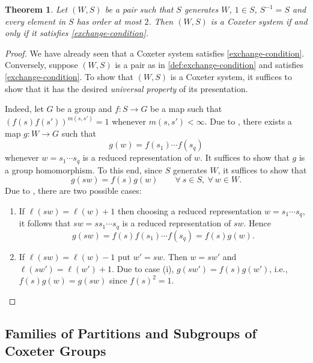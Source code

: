\documentclass{article}
\theoremstyle{thmstyle}
\newtheorem{theorem}{Theorem}[section]
\theoremstyle{defstyle}
\begin{document}
\begin{theorem}
    Let $(W, S)$ be a pair such that $S$ generates $W$, $1\in S$, $S^{-1} = S$ and every element in $S$ has order at most $2$. Then $(W, S)$ is a Coxeter system if and only if it satisfies \ref{exchange-condition}.
\end{theorem}
\begin{proof}
    We have already seen that a Coxeter system satisfies \ref{exchange-condition}. Conversely, suppose $(W, S)$ is a pair as in \ref{def:exchange-condition} and satisfies \ref{exchange-condition}. To show that $(W, S)$ is a Coxeter system, it suffices to show that it has the desired \emph{universal property} of its presentation.

    Indeed, let $G$ be a group and $f: S\to G$ be a map such that $\left(f(s)f(s')\right)^{m(s, s')} = 1$ whenever $m(s, s') < \infty$. Due to , there exists a map $g: W\to G$ such that 
    \begin{equation*}
        g(w) = f(s_1)\cdots f(s_q)
    \end{equation*}
    whenever $w = s_1\cdots s_q$ is a reduced representation of $w$. It suffices to show that $g$ is a group homomorphism. To this end, since $S$ generates $W$, it suffices to show that 
    \begin{equation*}
        g(sw) = f(s)g(w)\qquad \forall~s\in S,~\forall~w\in W.
    \end{equation*}
    Due to , there are two possible cases: 
    \begin{enumerate}[label=(\roman*)]
        \item If $\ell(sw) = \ell(w) + 1$ then choosing a reduced representation $w = s_1\cdots s_q$, it follows that $sw = ss_1\cdots s_q$ is a reduced representation of $sw$. Hence 
        \begin{equation*}
            g(sw) = f(s)f(s_1)\cdots f(s_q) = f(s)g(w).
        \end{equation*}

        \item If $\ell(sw) = \ell(w) - 1$ put $w' = sw$. Then $w = sw'$ and $\ell(sw') = \ell(w') + 1$. Due to case (i), $g(sw') = f(s)g(w')$, i.e., $f(s)g(w) = g(sw)$ since $f(s)^2 = 1$. \qedhere
    \end{enumerate}
\end{proof}

\subsection{Families of Partitions and Subgroups of Coxeter Groups}
\end{document}
